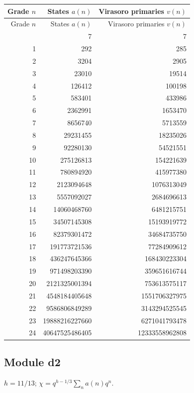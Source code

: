 \begingroup\small
\setlength{\tabcolsep}{5pt}
\begin{longtable}{@{}rrr@{}}
\toprule
Grade $n$ & States $a(n)$ & Virasoro primaries $v(n)$\\
\midrule\endfirsthead
\toprule
Grade $n$ & States $a(n)$ & Virasoro primaries $v(n)$\\
\midrule\endhead
\bottomrule\endfoot
0 & 7 & 7\\
1 & 292 & 285\\
2 & 3204 & 2905\\
3 & 23010 & 19514\\
4 & 126412 & 100198\\
5 & 583401 & 433986\\
6 & 2362991 & 1653470\\
7 & 8656740 & 5713559\\
8 & 29231455 & 18235026\\
9 & 92280130 & 54521551\\
10 & 275126813 & 154221639\\
11 & 780894920 & 415977380\\
12 & 2123094648 & 1076313049\\
13 & 5557092027 & 2684696613\\
14 & 14060468760 & 6481215751\\
15 & 34507145308 & 15193919772\\
16 & 82379301472 & 34684735750\\
17 & 191773721536 & 77284909612\\
18 & 436247645366 & 168430223304\\
19 & 971498203390 & 359651616744\\
20 & 2121325001394 & 753613575117\\
21 & 4548184405648 & 1551706327975\\
22 & 9586806849289 & 3143294525545\\
23 & 19888216227660 & 6271041793478\\
24 & 40647525486405 & 12333558962808\\
\end{longtable}
\endgroup

\subsection{Module d2}
$h=11/13$; $\chi=q^{h-1/3}\sum_n a(n)q^n$.

